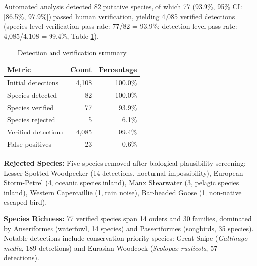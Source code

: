 \documentclass[twocolumn]{article}
\begin{document}
Automated analysis detected 82 putative species, of which 77 (93.9\%, 95\% CI: [86.5\%, 97.9\%]) passed human verification, yielding 4,085 verified detections (species-level verification pass rate: 77/82 = 93.9\%; detection-level pass rate: 4,085/4,108 = 99.4\%, Table \ref{tab:verification}).

\begin{table}[H]
\centering
\caption{Detection and verification summary}
\label{tab:verification}
\begin{tabular}{lrr}
\toprule
\textbf{Metric} & \textbf{Count} & \textbf{Percentage} \\
\midrule
Initial detections & 4,108 & 100.0\% \\
Species detected & 82 & 100.0\% \\
Species verified & 77 & 93.9\% \\
Species rejected & 5 & 6.1\% \\
Verified detections & 4,085 & 99.4\% \\
False positives & 23 & 0.6\% \\
\bottomrule
\end{tabular}
\end{table}

\textbf{Rejected Species:} Five species removed after biological plausibility screening: Lesser Spotted Woodpecker (14 detections, nocturnal impossibility), European Storm-Petrel (4, oceanic species inland), Manx Shearwater (3, pelagic species inland), Western Capercaillie (1, rain noise), Bar-headed Goose (1, non-native escaped bird).

\textbf{Species Richness:} 77 verified species span 14 orders and 30 families, dominated by Anseriformes (waterfowl, 14 species) and Passeriformes (songbirds, 35 species). Notable detections include conservation-priority species: Great Snipe (\textit{Gallinago media}, 189 detections) and Eurasian Woodcock (\textit{Scolopax rusticola}, 57 detections).
\end{document}
